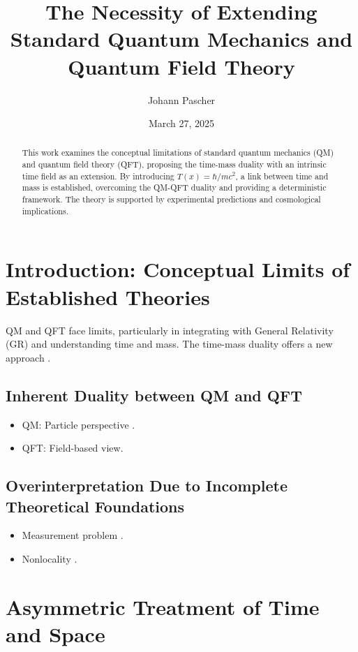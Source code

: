 \documentclass[12pt,a4paper]{article}
\title{The Necessity of Extending Standard Quantum Mechanics and Quantum Field Theory}
\author{Johann Pascher}
\date{March 27, 2025}
\newcommand{\Tfield}{T(x)}
\begin{document}
	
	\maketitle
	
	\begin{abstract}
		This work examines the conceptual limitations of standard quantum mechanics (QM) and quantum field theory (QFT), proposing the time-mass duality with an intrinsic time field as an extension. By introducing \(\Tfield = \hbar/mc^2\), a link between time and mass is established, overcoming the QM-QFT duality and providing a deterministic framework. The theory is supported by experimental predictions and cosmological implications.
	\end{abstract}
	
	\tableofcontents
	\newpage
	
	\section{Introduction: Conceptual Limits of Established Theories}
	QM and QFT face limits, particularly in integrating with General Relativity (GR) and understanding time and mass. The time-mass duality offers a new approach \cite{pascher_wesentl_2025}.
	
	\subsection{Inherent Duality between QM and QFT}
	\begin{itemize}
		\item QM: Particle perspective \cite{schrodinger}.
		\item QFT: Field-based view.
	\end{itemize}
	
	\subsection{Overinterpretation Due to Incomplete Theoretical Foundations}
	\begin{itemize}
		\item Measurement problem \cite{einstein2}.
		\item Nonlocality \cite{bell}.
	\end{itemize}
	
	\section{Asymmetric Treatment of Time and Space}
\end{document}
